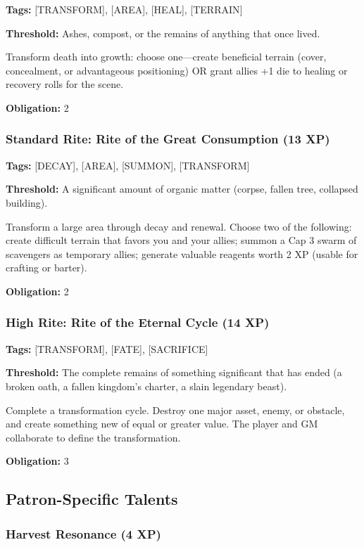 \textbf{Tags:} [TRANSFORM], [AREA], [HEAL], [TERRAIN]

\textbf{Threshold:} Ashes, compost, or the remains of anything that once lived.

Transform death into growth: choose one—create beneficial terrain (cover, concealment, or advantageous positioning) OR grant allies +1 die to healing or recovery rolls for the scene.

\textbf{Obligation:} 2

\subsubsection{Standard Rite: Rite of the Great Consumption (13 XP)}

\textbf{Tags:} [DECAY], [AREA], [SUMMON], [TRANSFORM]

\textbf{Threshold:} A significant amount of organic matter (corpse, fallen tree, collapsed building).

Transform a large area through decay and renewal. Choose two of the following: create difficult terrain that favors you and your allies; summon a Cap 3 swarm of scavengers as temporary allies; generate valuable reagents worth 2 XP (usable for crafting or barter).

\textbf{Obligation:} 2

\subsubsection{High Rite: Rite of the Eternal Cycle (14 XP)}

\textbf{Tags:} [TRANSFORM], [FATE], [SACRIFICE]

\textbf{Threshold:} The complete remains of something significant that has ended (a broken oath, a fallen kingdom's charter, a slain legendary beast).

Complete a transformation cycle. Destroy one major asset, enemy, or obstacle, and create something new of equal or greater value. The player and GM collaborate to define the transformation.

\textbf{Obligation:} 3

\subsection{Patron-Specific Talents}

\subsubsection{Harvest Resonance (4 XP)}


